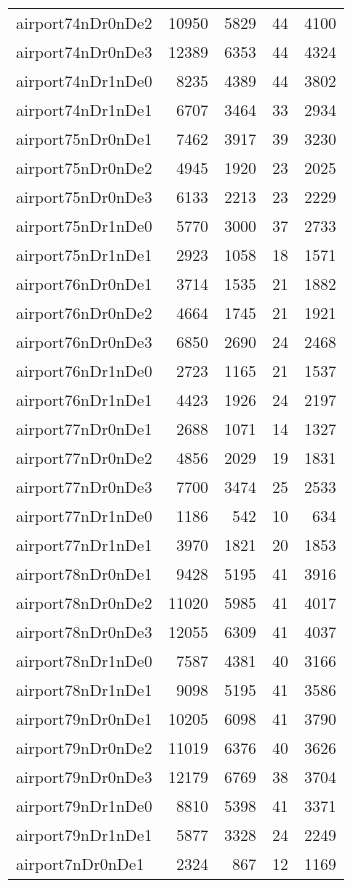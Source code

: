 \documentclass[../../../thesis.tex]{subfiles}
\begin{document}
\begin{longtable}{lrrrr}
airport74nDr0nDe2 & 10950 & 5829 & 44 & 4100 \\
airport74nDr0nDe3 & 12389 & 6353 & 44 & 4324 \\
airport74nDr1nDe0 & 8235 & 4389 & 44 & 3802 \\
airport74nDr1nDe1 & 6707 & 3464 & 33 & 2934 \\
airport75nDr0nDe1 & 7462 & 3917 & 39 & 3230 \\
airport75nDr0nDe2 & 4945 & 1920 & 23 & 2025 \\
airport75nDr0nDe3 & 6133 & 2213 & 23 & 2229 \\
airport75nDr1nDe0 & 5770 & 3000 & 37 & 2733 \\
airport75nDr1nDe1 & 2923 & 1058 & 18 & 1571 \\
airport76nDr0nDe1 & 3714 & 1535 & 21 & 1882 \\
airport76nDr0nDe2 & 4664 & 1745 & 21 & 1921 \\
airport76nDr0nDe3 & 6850 & 2690 & 24 & 2468 \\
airport76nDr1nDe0 & 2723 & 1165 & 21 & 1537 \\
airport76nDr1nDe1 & 4423 & 1926 & 24 & 2197 \\
airport77nDr0nDe1 & 2688 & 1071 & 14 & 1327 \\
airport77nDr0nDe2 & 4856 & 2029 & 19 & 1831 \\
airport77nDr0nDe3 & 7700 & 3474 & 25 & 2533 \\
airport77nDr1nDe0 & 1186 & 542 & 10 & 634 \\
airport77nDr1nDe1 & 3970 & 1821 & 20 & 1853 \\
airport78nDr0nDe1 & 9428 & 5195 & 41 & 3916 \\
airport78nDr0nDe2 & 11020 & 5985 & 41 & 4017 \\
airport78nDr0nDe3 & 12055 & 6309 & 41 & 4037 \\
airport78nDr1nDe0 & 7587 & 4381 & 40 & 3166 \\
airport78nDr1nDe1 & 9098 & 5195 & 41 & 3586 \\
airport79nDr0nDe1 & 10205 & 6098 & 41 & 3790 \\
airport79nDr0nDe2 & 11019 & 6376 & 40 & 3626 \\
airport79nDr0nDe3 & 12179 & 6769 & 38 & 3704 \\
airport79nDr1nDe0 & 8810 & 5398 & 41 & 3371 \\
airport79nDr1nDe1 & 5877 & 3328 & 24 & 2249 \\
airport7nDr0nDe1 & 2324 & 867 & 12 & 1169 \\

\end{longtable}
\end{document}
